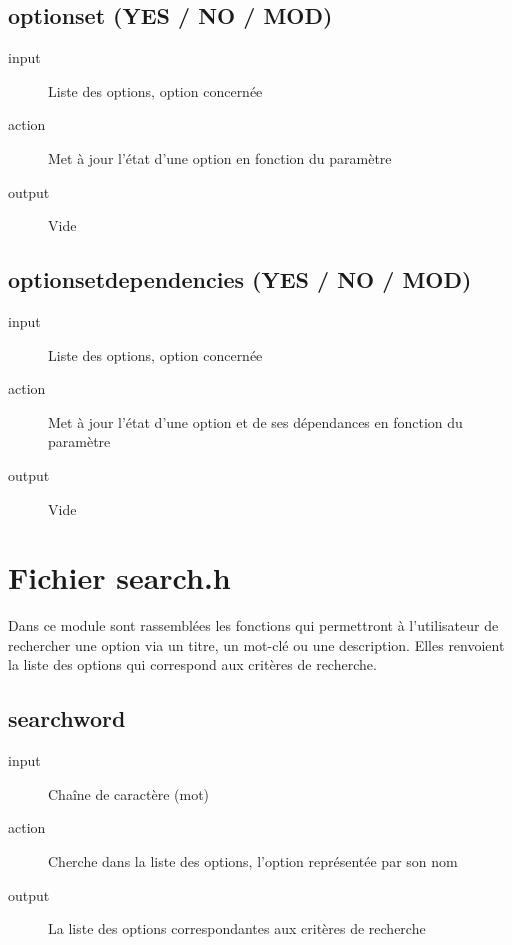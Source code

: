 \documentclass[16pts]{report}
\begin{document}
\section{option\textunderscore set (YES / NO / MOD)}
\label{sec:option set (YES / NO / MOD)}
\begin{description}
    \item[input] Liste des options, option concernée
    \item[action] Met à jour l’état d’une option en fonction du paramètre
    \item[output] Vide
\end{description}

\section{option\textunderscore set\textunderscore dependencies (YES / NO / MOD)}
\label{sec:option set dependencies (YES / NO / MOD)}
\begin{description}
    \item[input] Liste des options, option concernée
    \item[action] Met à jour l’état d’une option et de ses dépendances en fonction du paramètre
    \item[output] Vide
\end{description}


\chapter{Fichier search.h}
\label{cha:Fichier search.h}

Dans ce module sont rassemblées les fonctions qui permettront à l’utilisateur
de rechercher une option via un titre, un mot-clé ou une description. Elles
renvoient la liste des options qui correspond aux critères de recherche.

\section{search\textunderscore word}
\label{sec:search word}
\begin{description}
    \item[input] Chaîne de caractère (mot)
    \item[action] Cherche dans la liste des options, l’option représentée par son nom
    \item[output] La liste des options correspondantes aux critères de recherche
\end{description}
\end{document}
